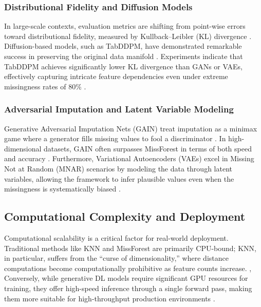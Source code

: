 \documentclass[twocolumn, 9pt]{extarticle}
\begin{document}
\subsubsection{Distributional Fidelity and Diffusion Models}
In large-scale contexts, evaluation metrics are shifting from point-wise errors toward distributional fidelity, measured by Kullback–Leibler (KL) divergence . Diffusion-based models, such as TabDDPM, have demonstrated remarkable success in preserving the original data manifold . Experiments indicate that TabDDPM achieves significantly lower KL divergence than GANs or VAEs, effectively capturing intricate feature dependencies even under extreme missingness rates of 80\% \cite{Kotelnikov2023}.

\subsubsection{Adversarial Imputation and Latent Variable Modeling}
Generative Adversarial Imputation Nets (GAIN) treat imputation as a minimax game where a generator fills missing values to fool a discriminator \cite{Yoon2018}. In high-dimensional datasets, GAIN often surpasses MissForest in terms of both speed and accuracy \cite{sun2023deep}.\cite{Yoon2018} Furthermore, Variational Autoencoders (VAEs) excel in Missing Not at Random (MNAR) scenarios by modeling the data through latent variables, allowing the framework to infer plausible values even when the missingness is systematically biased \cite{sun2023deep}.



\subsection{Computational Complexity and Deployment}
Computational scalability is a critical factor for real-world deployment. Traditional methods like KNN and MissForest are primarily CPU-bound; KNN, in particular, suffers from the ``curse of dimensionality,'' where distance computations become computationally prohibitive as feature counts increase. \cite{Stekhoven2012},\cite{Bertsimas2018}
 Conversely, while generative DL models require significant GPU resources for training, they offer high-speed inference through a single forward pass, making them more suitable for high-throughput production environments \cite{Bertsimas2018}.
\end{document}
